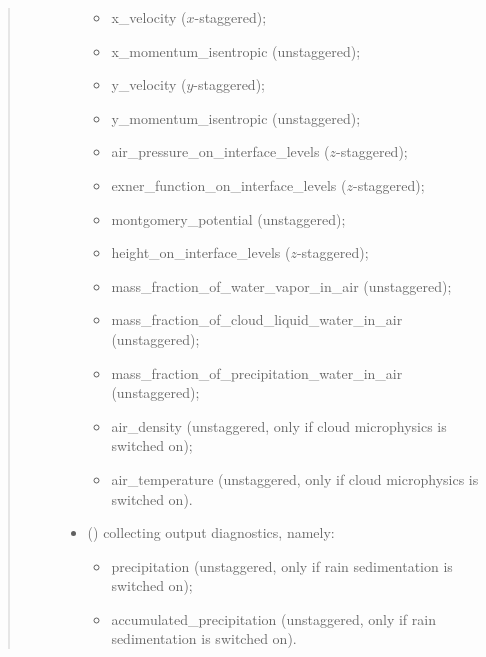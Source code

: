 \documentclass[letterpaper,10pt,english]{sphinxmanual}
\begin{document}
\begin{fulllineitems}
\begin{fulllineitems}
\begin{quote}
\begin{description}
\begin{itemize}
\begin{itemize}
\item {} 
x\_velocity (\(x\)-staggered);

\item {} 
x\_momentum\_isentropic (unstaggered);

\item {} 
y\_velocity (\(y\)-staggered);

\item {} 
y\_momentum\_isentropic (unstaggered);

\item {} 
air\_pressure\_on\_interface\_levels (\(z\)-staggered);

\item {} 
exner\_function\_on\_interface\_levels (\(z\)-staggered);

\item {} 
montgomery\_potential (unstaggered);

\item {} 
height\_on\_interface\_levels (\(z\)-staggered);

\item {} 
mass\_fraction\_of\_water\_vapor\_in\_air (unstaggered);

\item {} 
mass\_fraction\_of\_cloud\_liquid\_water\_in\_air (unstaggered);

\item {} 
mass\_fraction\_of\_precipitation\_water\_in\_air (unstaggered);

\item {} 
air\_density (unstaggered, only if cloud microphysics is switched on);

\item {} 
air\_temperature (unstaggered, only if cloud microphysics is switched on).

\end{itemize}

\item {} 
 () \textendash{} {\hyperref[\detokenize{api:tasmania.storages.grid_data.GridData}]{}} collecting output diagnostics, namely:
\begin{itemize}
\item {} 
precipitation (unstaggered, only if rain sedimentation is switched on);

\item {} 
accumulated\_precipitation (unstaggered, only if rain sedimentation is switched on).


\end{itemize}
\end{itemize}
\end{description}
\end{quote}
\end{fulllineitems}
\end{fulllineitems}
\end{document}
